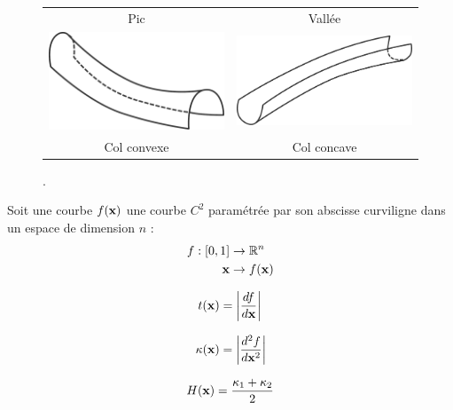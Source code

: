 \begin{figure}[ht]
\begin{center}
\begin{tabular}{cc}
      \\
      Pic &
      Vallée
      \\
      \includegraphics[width=5.5cm]{figures/curv_col_conv} &
      \includegraphics[width=5.5cm]{figures/curv_col_conc}
      \\
      Col convexe &
      Col concave
    \end{tabular}
    \caption[]{.\label{fig:curvature-figures}}
  \end{center}
\end{figure}


%
Soit une courbe $f(\mathbf{x})$ une courbe $C^2$ paramétrée par son abscisse curviligne dans un espace de dimension $n$ :
\begin{align}
    f : [0,1] &\rightarrow \mathbb{R}^n \nonumber\\
    \mathbf{x} &\rightarrow f(\mathbf{x})
\end{align}

\begin{equation}
  t(\mathbf{x}) = \left| \frac{df}{d\mathbf{x}} \right|
\end{equation}

\begin{equation}
  \kappa(\mathbf{x}) = \left| \frac{d^2f}{d\mathbf{x}^2} \right|
\end{equation}

\begin{equation}
  H(\mathbf{x}) = \frac{\kappa_{1} + \kappa_{2}}{2}
\end{equation}

